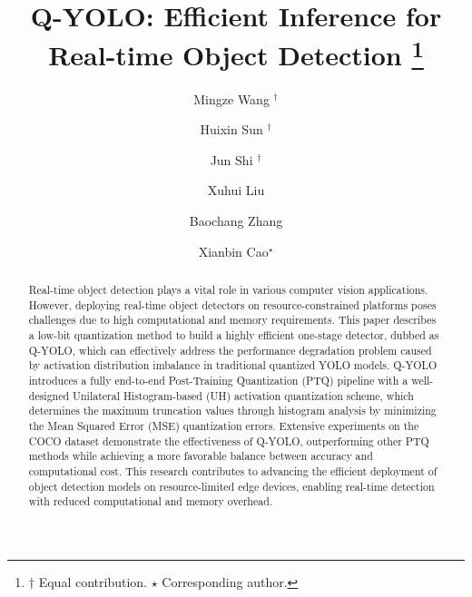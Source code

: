 \documentclass[runningheads]{llncs}
\begin{document}
%
\title{Q-YOLO: Efficient Inference for Real-time Object Detection \thanks{$\dag$ Equal contribution. $\star$ Corresponding author.}}
%
\author{
Mingze Wang $^{\dag}$ \and
Huixin Sun $^{\dag}$\and
Jun Shi $^{\dag}$ \and
Xuhui Liu \and
Baochang Zhang \and 
Xianbin Cao$^{\star}$
}
\maketitle              %
\begin{abstract}
Real-time object detection plays a vital role in various computer vision applications. However, deploying real-time object detectors on resource-constrained platforms poses challenges due to high computational and memory requirements. This paper describes a low-bit quantization method to build  a highly efficient one-stage detector, dubbed as  Q-YOLO, which can effectively address the performance degradation problem caused by activation distribution imbalance in traditional quantized YOLO models. Q-YOLO introduces a fully end-to-end Post-Training Quantization (PTQ) pipeline with a well-designed Unilateral Histogram-based (UH) activation quantization scheme, which determines the maximum truncation values through histogram analysis by minimizing the Mean Squared Error (MSE) quantization errors. Extensive experiments on the COCO dataset demonstrate the effectiveness of Q-YOLO, outperforming other PTQ methods while achieving a more favorable balance between accuracy and computational cost. This research contributes to advancing the efficient deployment of object detection models on resource-limited edge devices, enabling real-time detection with reduced computational and memory overhead.
%
\end{abstract}
%
\end{document}
